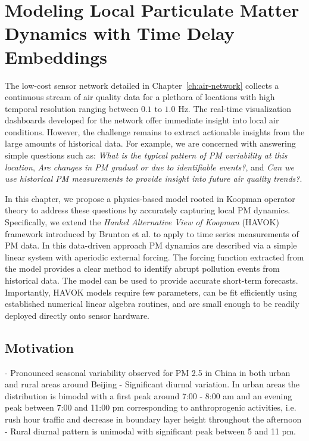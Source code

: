 \chapter{Modeling Local Particulate Matter Dynamics with Time Delay Embeddings}\label{ch:havok}

The low-cost sensor network detailed in Chapter~\ref{ch:air-network} collects a
continuous stream of air quality data for a plethora of locations with high
temporal resolution ranging between $0.1$ to $1.0$ Hz. The real-time
visualization dashboards developed for the network offer immediate insight into
local air conditions. However, the challenge remains to extract actionable
insights from the large amounts of historical data. For example, we are concerned
with answering simple questions such as: \textit{What is the typical pattern of
  PM variability at this location}, \textit{Are changes in PM gradual or due to
  identifiable events?}, and \textit{Can we use historical PM measurements to
  provide insight into future air quality trends?}.

In this chapter, we propose a physics-based model rooted in Koopman operator
theory to address these questions by accurately capturing local PM dynamics.
Specifically, we extend the \textit{Hankel Alternative View of Koopman} (HAVOK)
framework introduced by Brunton et al. to apply to time series measurements of
PM data. In this data-driven approach PM dynamics are described via a simple
linear system with aperiodic external forcing. The forcing function extracted
from the model provides a clear method to identify abrupt pollution events from
historical data. The model can be used to provide accurate short-term forecasts.
Importantly, HAVOK models require few parameters, can be fit efficiently using
established numerical linear algebra routines, and are small enough to be
readily deployed directly onto sensor hardware.


\section{Motivation}


- Pronounced seasonal variability observed for PM 2.5 in China in both urban and
rural areas around Beijing \cite{pm-patterns-china}
- Significant diurnal variation. In urban areas the distribution is bimodal with
a first peak around 7:00 - 8:00 am and an evening peak between 7:00 and 11:00 pm
corresponding to anthroprogenic activities, i.e. rush hour traffic and decrease
in boundary layer height throughout the afternoon \cite{pm-patterns-china}
- Rural diurnal pattern is unimodal with significant peak between 5 and 11 pm.

